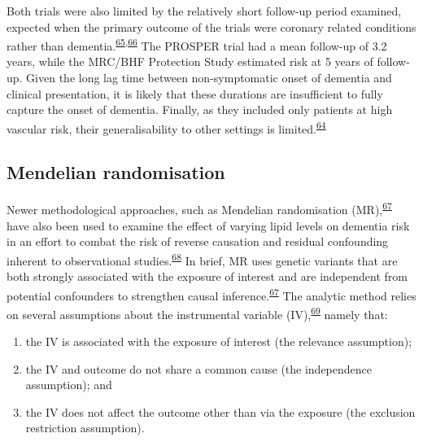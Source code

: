 \documentclass[a4paper, twoside]{templates/ociamthesis}
\providecommand{\tightlist}{%
  \setlength{\itemsep}{0pt}\setlength{\parskip}{0pt}}
\begin{document}
Both trials were also limited by the relatively short follow-up period examined, expected when the primary outcome of the trials were coronary related conditions rather than dementia.\textsuperscript{\protect\hyperlink{ref-trompet2010}{65},\protect\hyperlink{ref-heartprotectionstudycollaborativegroup2002}{66}} The PROSPER trial had a mean follow-up of 3.2 years, while the MRC/BHF Protection Study estimated risk at 5 years of follow-up. Given the long lag time between non-symptomatic onset of dementia and clinical presentation, it is likely that these durations are insufficient to fully capture the onset of dementia. Finally, as they included only patients at high vascular risk, their generalisability to other settings is limited.\textsuperscript{\protect\hyperlink{ref-mcguinness2016}{64}}

\hypertarget{mendelian-randomisation}{%
\subsection{Mendelian randomisation}\label{mendelian-randomisation}}

Newer methodological approaches, such as Mendelian randomisation (MR),\textsuperscript{\protect\hyperlink{ref-daveysmith2014}{67}} have also been used to examine the effect of varying lipid levels on dementia risk in an effort to combat the risk of reverse causation and residual confounding inherent to observational studies.\textsuperscript{\protect\hyperlink{ref-greenland2000}{68}} In brief, MR uses genetic variants that are both strongly associated with the exposure of interest and are independent from potential confounders to strengthen causal inference.\textsuperscript{\protect\hyperlink{ref-daveysmith2014}{67}} The analytic method relies on several assumptions about the instrumental variable (IV),\textsuperscript{\protect\hyperlink{ref-davies2018}{69}} namely that:

\begin{enumerate}
\def\labelenumi{\arabic{enumi}.}
\tightlist
\item
  the IV is associated with the exposure of interest (the relevance assumption);
\item
  the IV and outcome do not share a common cause (the independence assumption); and
\item
  the IV does not affect the outcome other than via the exposure (the exclusion restriction assumption).
\end{enumerate}
\end{document}
